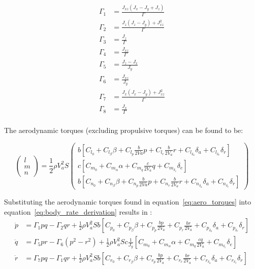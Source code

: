 \begin{equation}
\begin{split}
\Gamma_1&=\frac{J_{xz}(J_x-J_y+J_z)}{\Gamma}\\
\Gamma_2&=\frac{J_z(J_z-J_y)+J_{xz}^2}{\Gamma}\\
\Gamma_3&=\frac{J_z}{\Gamma}\\
\Gamma_4&=\frac{J_{xz}}{\Gamma}\\
\Gamma_5&=\frac{J_z-J_x}{J_y}\\
\Gamma_6&=\frac{J_{xz}}{J_y}\\
\Gamma_7&=\frac{J_x(J_x-J_y)+J_{xz}^2}{\Gamma}\\
\Gamma_8&=\frac{J_x}{\Gamma}\\
\end{split}
\end{equation}

The aerodynamic torques (excluding propulsive torques) can be found to be:

\begin{equation}\label{eq:aero_torques}
\begin{pmatrix}
  l\\
  m\\
  n
 \end{pmatrix}
 =
 \frac{1}{2}\rho V_a^2S
 \begin{pmatrix}
  b\left[C_{l_0}+C_{l_\beta}\beta+C_{l_p}\frac{b}{2Va}p+C_{l_r}\frac{b}{2V_a}r+C_{l_{\delta_a}}\delta_a+C_{l_{\delta_r}}\delta_r\right]\\
  c\left[C_{m_0}+C_{m_\alpha}\alpha+C_{m_q}\frac{c}{2V_a}q+C_{m_{\delta_e}}\delta_e\right]\\
  b\left[C_{n_0}+C_{n_\beta}\beta+C_{n_p}\frac{b}{2Va}p+C_{n_r}\frac{b}{2V_a}r+C_{n_{\delta_a}}\delta_a+C_{n_{\delta_r}}\delta_r\right]
 \end{pmatrix}
\end{equation}

Substituting the aerodynamic torques found in equation~\ref{eq:aero_torques} into equation~\ref{eq:body_rate_derivation} results in \cite{beard2012small}:
\begin{equation}\label{eq:body_rate_equations}
\begin{split}
 \dot{p}&=\Gamma_1pq-\Gamma_2qr+\frac{1}{2}\rho V_a^2Sb\left[C_{p_0}+C_{p_\beta}\beta+C_{p_p}\frac{bp}{2V_a}+C_{p_r}\frac{br}{2V_a}+C_{p_{\delta_a}}\delta_a+C_{p_{\delta_r}}\delta_r\right]\\
 \dot{q}&=\Gamma_5pr-\Gamma_6(p^2-r^2)+\frac{1}{2}\rho V_a^2Sc\frac{1}{J_y}\left[C_{m_0}+C_{m_\alpha}\alpha+C_{m_q}\frac{cq}{2V_a}+C_{m_{\delta_e}}\delta_e\right]\\
 \dot{r}&=\Gamma_7pq-\Gamma_1qr+\frac{1}{2}\rho V_a^2Sb\left[C_{r_0}+C_{r_\beta}\beta+C_{r_p}\frac{bp}{2V_a}+C_{r_r}\frac{br}{2V_a}+C_{r_{\delta_a}}\delta_a+C_{r_{\delta_r}}\delta_r\right]
\end{split} 
\end{equation}

